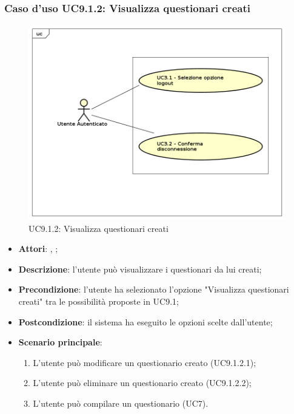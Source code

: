 		\subsubsection{Caso d'uso UC9.1.2: Visualizza questionari creati}
		\label{UC9.1.2}
		\begin{figure}[h]
			\centering
		\includegraphics[scale=0.7,keepaspectratio]{UML/UC9.png}
			\caption{UC9.1.2: Visualizza questionari creati}
		\end{figure}
		\FloatBarrier
		\begin{itemize}
			\item \textbf{Attori}: \uau, \uaupro;
			\item \textbf{Descrizione}: l'utente può visualizzare i questionari da lui creati;
			\item \textbf{Precondizione}: l'utente ha selezionato l'opzione "Visualizza questionari creati" tra le possibilità proposte in UC9.1;
			\item \textbf{Postcondizione}: il sistema ha eseguito le opzioni scelte dall'utente;
			\item \textbf{Scenario principale}: 
				\begin{enumerate}
					\item L'utente può modificare un questionario creato (UC9.1.2.1);
					\item L'utente può eliminare un questionario creato (UC9.1.2.2);
					\item L'utente può compilare un questionario (UC7).
				\end{enumerate}
		\end{itemize}
		
